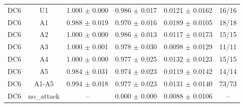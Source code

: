 \begin{tabular}{lccccc}
DC6 & U1 & 1.000 $\pm$ 0.000 & 0.986 $\pm$ 0.017 & 0.0121 $\pm$ 0.0162 & 16/16 \\
DC6 & A1 & 0.988 $\pm$ 0.019 & 0.970 $\pm$ 0.016 & 0.0189 $\pm$ 0.0105 & 18/18 \\
DC6 & A2 & 1.000 $\pm$ 0.000 & 0.986 $\pm$ 0.013 & 0.0117 $\pm$ 0.0173 & 15/15 \\
DC6 & A3 & 1.000 $\pm$ 0.001 & 0.978 $\pm$ 0.030 & 0.0098 $\pm$ 0.0129 & 11/11 \\
DC6 & A4 & 1.000 $\pm$ 0.000 & 0.977 $\pm$ 0.025 & 0.0132 $\pm$ 0.0123 & 15/15 \\
DC6 & A5 & 0.984 $\pm$ 0.031 & 0.974 $\pm$ 0.023 & 0.0119 $\pm$ 0.0142 & 14/14 \\
DC6 & A1-A5 & 0.994 $\pm$ 0.018 & 0.977 $\pm$ 0.023 & 0.0131 $\pm$ 0.0140 & 73/73 \\
DC6 & no\_attack & -- & 0.000 $\pm$ 0.000 & 0.0088 $\pm$ 0.0106 & -- \\
\hline
\end{tabular}
